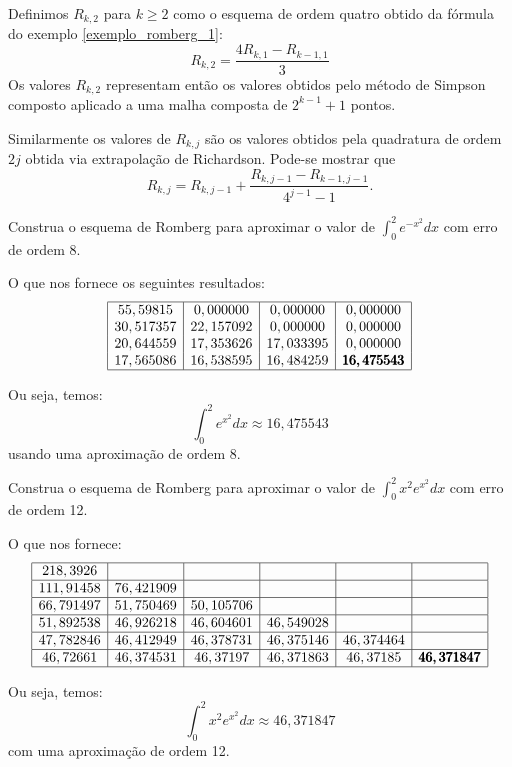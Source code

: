 Definimos $R_{k,2}$ para $k\geq 2$ como o esquema de ordem quatro obtido da fórmula do exemplo \ref{exemplo_romberg_1}:
$$R_{k,2}=\frac{4R_{k,1}-R_{k-1,1}}{3}$$
Os valores $R_{k,2}$ representam então os valores obtidos pelo método de Simpson composto aplicado a uma malha composta de $2^{k-1}+1$ pontos.

Similarmente os valores de $R_{k,j}$ são os valores obtidos pela quadratura de ordem $2j$ obtida via extrapolação de Richardson. Pode-se mostrar que
$$R_{k,j}=R_{k,j-1}+\frac{R_{k,j-1}-R_{k-1,j-1}}{4^{j-1}-1}.$$

\begin{ex} 
Construa o esquema de Romberg para aproximar o valor de $\int_0^2e^{-x^2}dx$ com erro de ordem 8.

O que nos fornece os seguintes resultados:
$$
\begin{array}{|c|c|c|c|}
\hline
    55,59815  &   0,000000    &       0,000000  &         0,000000         \\
    30,517357 &   22,157092 &   0,000000   &        0,000000         \\
    20,644559 &   17,353626 &   17,033395 &   0,000000         \\
    17,565086 &   16,538595  &  16,484259 &   \pmb{16,475543}  \\
\hline
\end{array}
$$

Ou seja, temos:
\begin{equation*}
  \int_0^2 e^{x^2}dx \approx 16,475543
\end{equation*}
usando uma aproximação de ordem 8.
\end{ex}


\begin{ex} Construa o esquema de Romberg para aproximar o valor de $\int_0^2x^2e^{x^2}dx$ com erro de ordem 12.

O que nos fornece:
$$
\begin{array}{|c|c|c|c|c|c|}
\hline
     218,3926  &          &           &            &           &         \\  \hline
    111,91458  &  76,421909 &           &            &           &         \\ \hline
    66,791497  &  51,750469 &   50,105706 &            &           &         \\  \hline
    51,892538  &  46,926218 &   46,604601 &   46,549028  &           &         \\  \hline
    47,782846  &  46,412949 &   46,378731 &   46,375146  &  46,374464  &         \\  \hline
    46,72661   &  46,374531 &   46,37197  &   46,371863  &  46,37185   &  \pmb{46,371847}\\
\hline
\end{array}
$$

Ou seja, temos:
\begin{equation*}
  \int_0^2 x^2e^{x^2}dx \approx 46,371847
\end{equation*}
com uma aproximação de ordem 12.
\end{ex}


